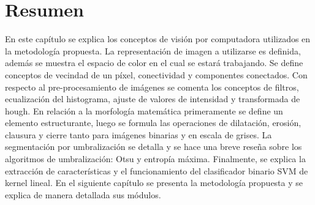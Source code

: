 \section{Resumen}


En este capítulo se explica los conceptos de visión por computadora utilizados en la metodología propuesta. La representación de imagen a utilizarse es definida, además se muestra el espacio de color en el cual se estará trabajando. Se define conceptos de vecindad de un píxel, conectividad y componentes conectados. 
Con respecto al pre-procesamiento de imágenes se comenta los conceptos de filtros, ecualización del histograma, ajuste de valores de intensidad y transformada de hough. En relación a la morfología matemática primeramente se define un elemento estructurante, luego se formula las operaciones de dilatación, erosión, clausura y cierre tanto para imágenes binarias y en escala de grises. La segmentación por umbralización se detalla y se hace una breve reseña sobre los algoritmos de umbralización: Otsu y entropía máxima. Finalmente, se explica la extracción de características y el funcionamiento del clasificador binario SVM de kernel lineal.
En el siguiente capítulo se presenta la metodología propuesta y se explica de manera detallada sus módulos.